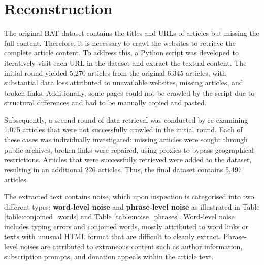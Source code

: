 \section{Reconstruction}

The original BAT dataset contains the titles and URLs of articles but missing the full content. Therefore, it is necessary to crawl the websites to retrieve the complete article content. To address this, a Python script was developed to iteratively visit each URL in the dataset and extract the textual content. The initial round yielded 5,270 articles from the original 6,345 articles, with substantial data loss attributed to unavailable websites, missing articles, and broken links. Additionally, some pages could not be crawled by the script due to structural differences and had to be manually copied and pasted.

Subsequently, a second round of data retrieval was conducted by re-examining 1,075 articles that were not successfully crawled in the initial round. Each of these cases was individually investigated: missing articles were sought through public archives, broken links were repaired, using proxies to bypass geographical restrictions. Articles that were successfully retrieved were added to the dataset, resulting in an additional 226 articles. Thus, the final dataset contains 5,497 articles.

The extracted text contains noise, which upon inspection is categorised into two different types: \textbf{word-level noise} and \textbf{phrase-level noise} as illustrated in Table \ref{table:conjoined_words} and Table \ref{table:noise_phrases}. Word-level noise includes typing errors and conjoined words, mostly attributed to word links or texts with unusual HTML format that are difficult to cleanly extract. Phrase-level noises are attributed to extraneous content such as author information, subscription prompts, and donation appeals within the article text.


